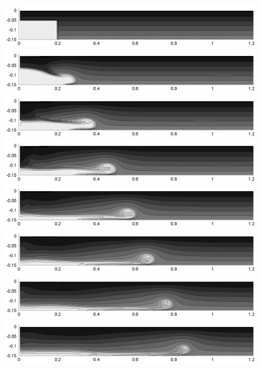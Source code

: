 \begin{figure}[htbp]
  \begin{center}    \includegraphics[scale=0.55]{../figures/colocated/Fig9case/140-60-03-VE-4/01.png}    \includegraphics[scale=0.55]{../figures/colocated/Fig9case/140-60-03-VE-4/02.png}
\includegraphics[scale=0.55]{../figures/colocated/Fig9case/140-60-03-VE-4/03.png}
\includegraphics[scale=0.55]{../figures/colocated/Fig9case/140-60-03-VE-4/04.png}    \includegraphics[scale=0.55]{../figures/colocated/Fig9case/140-60-03-VE-4/05.png}
\includegraphics[scale=0.55]{../figures/colocated/Fig9case/140-60-03-VE-4/06.png}
\includegraphics[scale=0.55]{../figures/colocated/Fig9case/140-60-03-VE-4/07.png}    \includegraphics[scale=0.55]{../figures/colocated/Fig9case/140-60-03-VE-4/08.png}

\end{center}
\end{figure}
